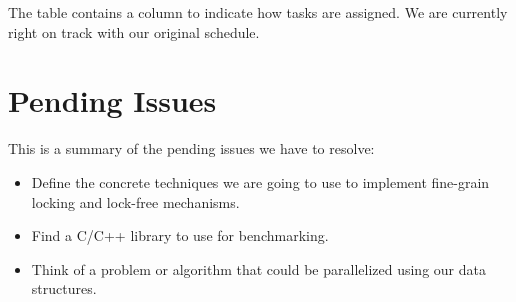 \documentclass[11pt]{article}
\begin{document}
The table contains a column to indicate how tasks are assigned. We are currently
right on track with our original schedule.

\section*{Pending Issues}
This is a summary of the pending issues we have to resolve:
\begin{itemize}
\item
Define the concrete techniques we are going to use to implement fine-grain locking and lock-free mechanisms.
\item
Find a C/C++ library to use for benchmarking.
\item
Think of a problem or algorithm that could be parallelized using our data structures.
\end{itemize}
\end{document}
